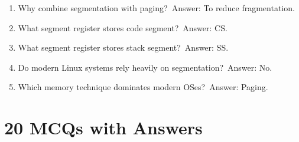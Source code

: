 \begin{enumerate}
\item Why combine segmentation with paging?\
Answer: To reduce fragmentation.

\item What segment register stores code segment?\
Answer: CS.

\item What segment register stores stack segment?\
Answer: SS.

\item Do modern Linux systems rely heavily on segmentation?\
Answer: No.

\item Which memory technique dominates modern OSes?\
Answer: Paging.
\end{enumerate}

\section{20 MCQs with Answers}

